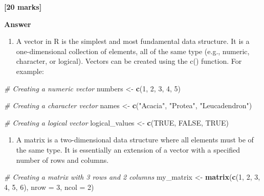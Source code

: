 \documentclass[
  10t,
]{article}
\newenvironment{Shaded}{\begin{snugshade}}{\end{snugshade}}
\newcommand{\AttributeTok}[1]{\textcolor[rgb]{0.13,0.29,0.53}{#1}}
\newcommand{\CommentTok}[1]{\textcolor[rgb]{0.56,0.35,0.01}{\textit{#1}}}
\newcommand{\ConstantTok}[1]{\textcolor[rgb]{0.56,0.35,0.01}{#1}}
\newcommand{\DecValTok}[1]{\textcolor[rgb]{0.00,0.00,0.81}{#1}}
\newcommand{\FunctionTok}[1]{\textcolor[rgb]{0.13,0.29,0.53}{\textbf{#1}}}
\newcommand{\NormalTok}[1]{#1}
\newcommand{\OtherTok}[1]{\textcolor[rgb]{0.56,0.35,0.01}{#1}}
\newcommand{\StringTok}[1]{\textcolor[rgb]{0.31,0.60,0.02}{#1}}
\providecommand{\tightlist}{%
  \setlength{\itemsep}{0pt}\setlength{\parskip}{0pt}}\usepackage{longtable,booktabs,array}
\renewcommand{\ttfamily}{\small\fontspec{FiraCode Nerd Font}\color{DeepSkyBlue4}}
\renewcommand{\texttt}[1]{{\ttfamily #1}}
\begin{document}
\textbf{{[}20 marks{]}}

\textbf{Answer}

\begin{enumerate}
\def\labelenumi{(\alph{enumi})}
\tightlist
\item
  A vector in R is the simplest and most fundamental data structure. It
  is a one-dimensional collection of elements, all of the same type
  (e.g., numeric, character, or logical). Vectors can be created using
  the \texttt{c()} function. For example:
\end{enumerate}

\begin{Shaded}
\begin{Highlighting}[]
\CommentTok{\# Creating a numeric vector}
\NormalTok{numbers }\OtherTok{\textless{}{-}} \FunctionTok{c}\NormalTok{(}\DecValTok{1}\NormalTok{, }\DecValTok{2}\NormalTok{, }\DecValTok{3}\NormalTok{, }\DecValTok{4}\NormalTok{, }\DecValTok{5}\NormalTok{)}

\CommentTok{\# Creating a character vector}
\NormalTok{names }\OtherTok{\textless{}{-}} \FunctionTok{c}\NormalTok{(}\StringTok{"Acacia"}\NormalTok{, }\StringTok{"Protea"}\NormalTok{, }\StringTok{"Leucadendron"}\NormalTok{)}

\CommentTok{\# Creating a logical vector}
\NormalTok{logical\_values }\OtherTok{\textless{}{-}} \FunctionTok{c}\NormalTok{(}\ConstantTok{TRUE}\NormalTok{, }\ConstantTok{FALSE}\NormalTok{, }\ConstantTok{TRUE}\NormalTok{)}
\end{Highlighting}
\end{Shaded}

\begin{enumerate}
\def\labelenumi{(\alph{enumi})}
\setcounter{enumi}{1}
\tightlist
\item
  A matrix is a two-dimensional data structure where all elements must
  be of the same type. It is essentially an extension of a vector with a
  specified number of rows and columns.
\end{enumerate}

\begin{Shaded}
\begin{Highlighting}[]
\CommentTok{\# Creating a matrix with 3 rows and 2 columns}
\NormalTok{my\_matrix }\OtherTok{\textless{}{-}} \FunctionTok{matrix}\NormalTok{(}\FunctionTok{c}\NormalTok{(}\DecValTok{1}\NormalTok{, }\DecValTok{2}\NormalTok{, }\DecValTok{3}\NormalTok{, }\DecValTok{4}\NormalTok{, }\DecValTok{5}\NormalTok{, }\DecValTok{6}\NormalTok{), }\AttributeTok{nrow =} \DecValTok{3}\NormalTok{, }\AttributeTok{ncol =} \DecValTok{2}\NormalTok{)}
\end{Highlighting}
\end{Shaded}
\end{document}
